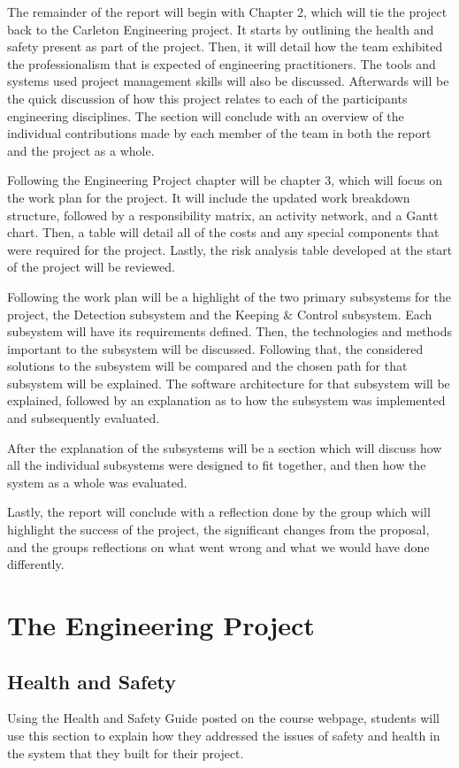 \documentclass[titlepage,draft]{article}
\begin{document}
The remainder of the report will begin with Chapter 2, which will tie the project back to the Carleton Engineering project. It starts by outlining the health and safety present as part of the project.  Then, it will detail how the team exhibited the professionalism that is expected of engineering practitioners. The tools and systems used project management skills will also be discussed. Afterwards will be the quick discussion of how this project relates to each of the participants engineering disciplines. The section will conclude with an overview of the individual contributions made by each member of the team in both the report and the project as a whole.

Following the Engineering Project chapter will be chapter 3, which will focus on the work plan for the project. It will include the updated work breakdown structure, followed by a responsibility matrix, an activity network, and a Gantt chart. Then, a table will detail all of the costs and any special components that were required for the project. Lastly, the risk analysis table developed at the start of the project will be reviewed.

Following the work plan will be a highlight of the two primary subsystems for the project, the Detection subsystem and the Keeping \& Control subsystem. Each subsystem will have its requirements defined. Then, the technologies and methods important to the subsystem will be discussed. Following that, the considered solutions to the subsystem will be compared and the chosen path for that subsystem will be explained. The software architecture for that subsystem will be explained, followed by an explanation as to how the subsystem was implemented and subsequently evaluated.

After the explanation of the subsystems will be a section which will discuss how all the individual subsystems were designed to fit together, and then how the system as a whole was evaluated.

Lastly, the report will conclude with a reflection done by the group which will highlight the success of the project, the significant changes from the proposal, and the groups reflections on what went wrong and what we would have done differently.

\section{The Engineering Project}

\subsection{Health and Safety}
Using the Health and Safety Guide posted on the course webpage, students will use this section to explain how they addressed the issues of safety and health in the system that they built for their project.
\end{document}
